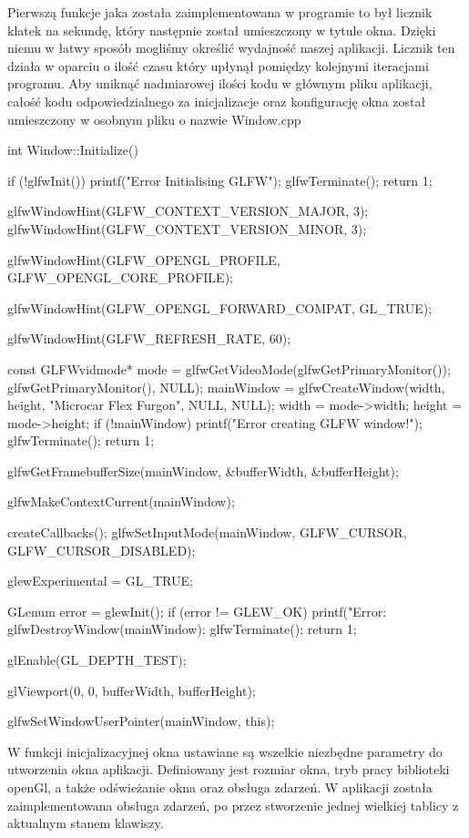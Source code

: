 \documentclass[a4paper,12pt]{article}
\numberwithin{equation}{section}
\begin{document}
Pierwszą funkcje jaka została zaimplementowana w programie to był licznik klatek na sekundę, który następnie został umieszczony w tytule okna. Dzięki niemu w łatwy sposób mogliśmy określić wydajność naszej aplikacji. Licznik ten działa w oparciu o ilość czasu który upłynął pomiędzy kolejnymi iteracjami programu.
\newline
\indent Aby uniknąć nadmiarowej ilości kodu w głównym pliku aplikacji, całość kodu odpowiedzialnego za inicjalizacje oraz konfigurację okna został umieszczony w osobnym pliku o nazwie Window.cpp
\begin{cppcode}

int Window::Initialize()
{
	if (!glfwInit())
	{
		printf("Error Initialising GLFW");
		glfwTerminate();
		return 1;
	}

	glfwWindowHint(GLFW_CONTEXT_VERSION_MAJOR, 3);
	glfwWindowHint(GLFW_CONTEXT_VERSION_MINOR, 3);

	glfwWindowHint(GLFW_OPENGL_PROFILE, GLFW_OPENGL_CORE_PROFILE);

	glfwWindowHint(GLFW_OPENGL_FORWARD_COMPAT, GL_TRUE);

	glfwWindowHint(GLFW_REFRESH_RATE, 60);

	const GLFWvidmode* mode = glfwGetVideoMode(glfwGetPrimaryMonitor());
    glfwGetPrimaryMonitor(), NULL);
	mainWindow = glfwCreateWindow(width, height, "Microcar Flex Furgon", NULL, NULL);
	width = mode->width;
	height = mode->height;
	if (!mainWindow)
	{
		printf("Error creating GLFW window!");
		glfwTerminate();
		return 1;
	}

	glfwGetFramebufferSize(mainWindow, &bufferWidth, &bufferHeight);

	glfwMakeContextCurrent(mainWindow);

	createCallbacks();
	glfwSetInputMode(mainWindow, GLFW_CURSOR, GLFW_CURSOR_DISABLED);

	glewExperimental = GL_TRUE;

	GLenum error = glewInit();
	if (error != GLEW_OK)
	{
		printf("Error: %
		glfwDestroyWindow(mainWindow);
		glfwTerminate();
		return 1;
	}

	glEnable(GL_DEPTH_TEST);

	glViewport(0, 0, bufferWidth, bufferHeight);

	glfwSetWindowUserPointer(mainWindow, this);
}
\end{cppcode}

W funkcji inicjalizacyjnej okna ustawiane są wszelkie niezbędne parametry do utworzenia okna aplikacji. Definiowany jest rozmiar okna, tryb pracy biblioteki openGl, a także odświeżanie okna oraz obsługa zdarzeń. W aplikacji została zaimplementowana obsługa zdarzeń, po przez stworzenie jednej wielkiej tablicy z aktualnym stanem klawiszy.
\newline
\end{document}
